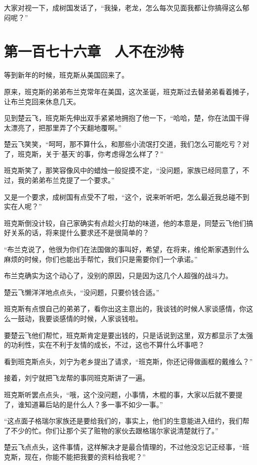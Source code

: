 大家对视一下，成树国发话了，“我操，老龙，怎么每次见面我都让你搞得这么郁闷呢？”

\section{第一百七十六章　人不在沙特}

等到新年的时候，班克斯从美国回来了。

原来，班克斯的弟弟布兰克常年在美国，这次圣诞，班克斯过去替弟弟看着摊子，让布兰克回来休息几天。

见到楚云飞，班克斯先伸出双手紧紧地拥抱了他一下，“哈哈，楚，你在法国干得太漂亮了，把那里弄了个天翻地覆啊。”

楚云飞笑笑，“呵呵，那不算什么，和那些小流氓打交道，我们怎么可能吃亏？对了，班克斯，关于‘基天’的事，你考虑得怎么样了？”

班克斯笑了，那笑容像风中的蜡烛一般捉摸不定，“没问题，家族已经同意了，不过，我的弟弟布兰克提了一个要求。”

又是一个要求，成树国有点受不了啦，“这个，说来听听吧，怎么最近我总碰不到实在人呢？”

班克斯倒没计较，自己家确实有点趁火打劫的味道，他的本意是，同楚云飞他们搞好关系的话，将来提什么要求还不是很简单的？

“布兰克说了，他很为你们在法国做的事叫好，希望，在将来，维伦斯家遇到什么麻烦的时候，你们也能出手帮忙，我们只是需要你们一个承诺。”

布兰克确实为这个动心了，没别的原因，只是因为这几个人超强的战斗力。

楚云飞懒洋洋地点点头，“没问题，只要价钱合适。”

班克斯有点恨自己的弟弟了，看你出这主意出的，我谈钱的时候人家谈感情，你这么一鼓动，我要谈感情的时候，人家谈钱啦。

要楚云飞他们帮忙，班克斯肯定是要出钱的，只是话说到这里，双方都显示了太强的功利性，实在不利于友情的成长，不过，这也不算什么坏事吧？

看到班克斯点头，刘宁为老乡提出了请求，“班克斯，你还记得做画框的戴维么？”

接着，刘宁就把飞龙帮的事同班克斯讲了一遍。

班克斯听罢点点头，“哦，这个没问题，小事情，木棍的事，大家以后就不要提了，谁知道幕后站的是什么人？多一事不如少一事。”

“这点面子格瑞尔家族还是要给我们的，事实上，他们的生意能进入纽约，我们帮了不少的忙。你们让那个买了赃物的家伙去跟格瑞尔家说清楚就行了。”

楚云飞点点头，这件事情，这样解决才是最合情理的，不过他没忘记正经事，“班克斯，现在，你能不能把我要的资料给我呢？”

